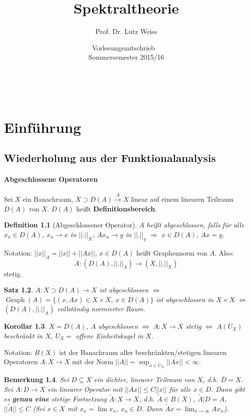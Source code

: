 \documentclass[12pt]{extreport} %
\title{Spektraltheorie}
\author{Prof. Dr. Lutz Weiss}
\date{Vorlesungsmitschrieb ~\vspace{0.2cm} \\ Sommersemester 2015/16}
\makeatletter
\newtheorem{Satz}{Satz}[subsection]
\newtheorem{Definition}[Satz]{Definition}
\newtheorem{Bemerkung}[Satz]{Bemerkung}
\newtheorem{Korollar}[Satz]{Korollar}
\DeclareMathOperator{\Graph}{Graph}
\numberwithin{equation}{section}
\def\maketitle{ \begin{titlepage} 
			~\vspace{3cm} 
		\begin{center} {\Huge \@title} \end{center} 
	 		\vspace*{1cm} 
	 	\begin{center} {\large \@author} \end{center} 
	 	\begin{center} \@date \end{center} 
	 		\vspace*{7cm} 
	 	\begin{center} \@publishers \end{center} 
	 		\vfill 
	\end{titlepage} }
\makeatother
\begin{document}
	\maketitle
	
	\tableofcontents
	\newpage
	\chapter{Einführung}
	
	\section{Wiederholung aus der Funktionalanalysis}
	
	\subsubsection{Abgeschlossene Operatoren}
	
	Sei $X$ ein Banachraum, $X\supset D(A)\overset{A}{\rightarrow} X$ linear auf einem linearen Teilraum $D(A)$ von $X$. $D(A)$ heißt \textbf{Definitionsbereich}. 
	
	\begin{Definition}[Abgeschlossener Operator]
		$A$ heißt abgeschlossen, falls für alle $x_n\in D(A)$, $x_n\rightarrow x$ in $||.||_X$, $Ax_n\rightarrow y$ in $||.||_y$ $\Rightarrow$ $x\in D(A)$, $Ax= y$.
	\end{Definition}
	
	Notation: $||x||_A = ||x||+||Ax||$, $x\in D(A)$ heißt Graphennorm von $A$. Also: 
	$$A:(D(A),||.||_A)\rightarrow (X,||.||_X)$$
	stetig.
	
	\begin{Satz}
		$A:X\supset D(A)\rightarrow X$ ist abgeschlossen $\Leftrightarrow$ $\Graph(A) = \{(x,Ax)\in X\times X,~ x\in D(A) \}$ ist abgeschlossen in $X\times X$ $\Leftrightarrow$ $(D(A),||.||_A)$ vollständig normierter Raum.
	\end{Satz}
	
	\begin{Korollar}
		$X = D(A)$, $A$ abgeschlossen $\Leftrightarrow$ $A:X\rightarrow X$ stetig $\Leftrightarrow$ $A(U_X)$ beschränkt in $X$, $U_X = $ offene Einheitskugel in $X$.
	\end{Korollar}
	
	Notation: $B(X)$ ist der Banachraum aller beschränkten/stetigen linearen Operatoren $A:X\rightarrow X$ mit der Norm $||A|| = \sup_{x\in U_X}||Ax|| <\infty$.
	
	\begin{Bemerkung}
		Sei $D\subseteq X$ ein dichter, linearer Teilraum von $X$, d.h. $\bar{D} = X$. Sei $A:D\rightarrow X$ ein linearer Operator mit $||Ax||\leq C||x||$ für alle $x\in D$. Dann gibt es \textbf{genau eine} stetige Fortsetzung $\tilde{A}: X\rightarrow X$, d.h. $\tilde{A}\in B(X)$, $\tilde{A}|D = A$, $||\tilde{A}||\leq C$ (Sei $x\in X$ mit $x_n=\lim x_n$, $x_n\in D$. Dann $\tilde{A}x=\lim_{n\rightarrow\infty} Ax_n$).
	\end{Bemerkung}
	
\end{document}
